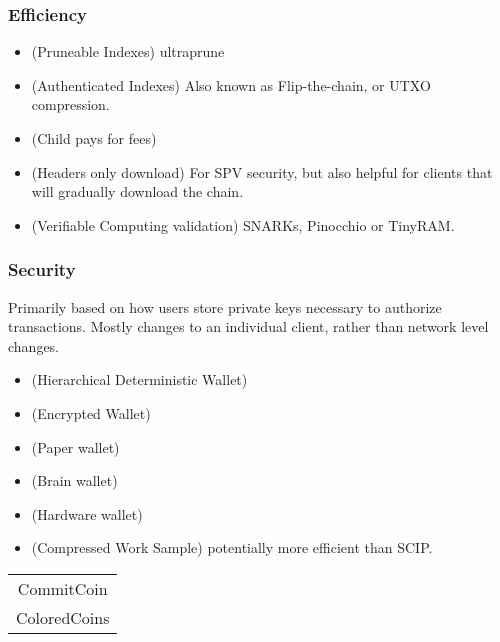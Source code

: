 \subsubsection{Efficiency}
\begin{itemize}
\item (Pruneable Indexes) ultraprune
\item (Authenticated Indexes) Also known as Flip-the-chain, or UTXO compression.
\item (Child pays for fees)
\item (Headers only download) For SPV security, but also helpful for clients that will gradually download the chain.
\item (Verifiable Computing validation) SNARKs, Pinocchio or TinyRAM.
\end{itemize}

\subsubsection{Security}
Primarily based on how users store private keys necessary to authorize transactions. Mostly changes to an individual client, rather than network level changes.
\begin{itemize}
\item (Hierarchical Deterministic Wallet)
\item (Encrypted Wallet)
\item (Paper wallet)
\item (Brain wallet)
\item (Hardware wallet)
\item (Compressed Work Sample) potentially more efficient than SCIP.
\end{itemize}


\begin{table}
\begin{tabular}{c}
CommitCoin \\
ColoredCoins \\
\end{tabular}
\end{table}
